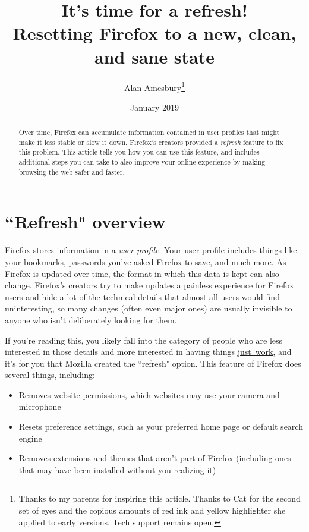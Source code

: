 \documentclass[fontsize=11pt]{article}
\begin{document}
{}

\title{\huge{It's time for a refresh!} \\ \small{Resetting Firefox to a new, clean, and sane state} }
\author{Alan Amesbury\thanks{Thanks to my parents for inspiring this article.  Thanks to Cat for the second set of eyes and the copious amounts of red ink and yellow highlighter she applied to early versions.  Tech support remains open.}}
\date{January 2019}


\maketitle

\begin{abstract}{Over time, Firefox can accumulate information contained in user profiles that might make it less stable or slow it down.  Firefox's creators provided a \emph{refresh} feature to fix this problem.  This article tells you how you can use this feature, and includes additional steps you can take to also improve your online experience by making browsing the web safer and faster.}
\end{abstract}




\section{``Refresh" overview}
Firefox stores information in a \emph{user profile}.  Your user profile includes things like your bookmarks, passwords you've asked Firefox to save, and much more.  As Firefox is updated over time, the format in which this data is kept can also change.  Firefox's creators try to make updates a painless experience for Firefox users and hide a lot of the technical details that almost all users would find uninteresting, so many changes (often even major ones) are usually invisible to anyone who isn't deliberately looking for them.

If you're reading this, you likely fall into the category of people who are less interested in those details and more interested in having things \underline{just~work}, and it's for you that Mozilla created the ``refresh" option.  This feature of Firefox does several things, including:
\begin{itemize}
	\item{Removes website permissions, which websites may use your camera and microphone}
	\item{Resets preference settings, such as your preferred home page or default search engine}
	\item{Removes extensions and themes that aren't part of Firefox (including ones that may have been installed without you realizing it)}
\end{itemize}
\end{document}

